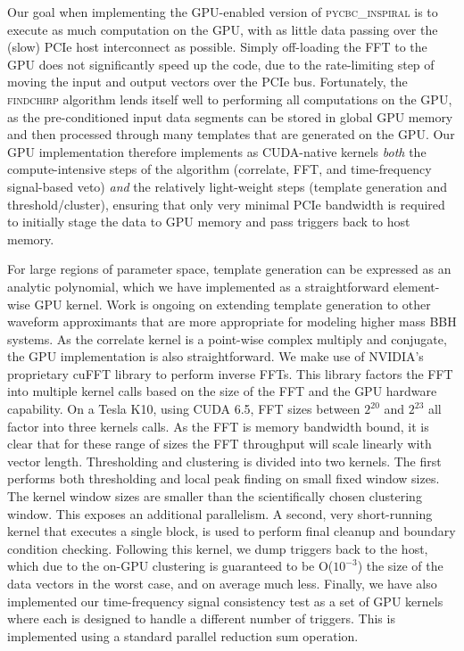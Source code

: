 Our goal when implementing the GPU-enabled version of \textsc{pycbc\_inspiral}
is to execute as much computation on the GPU, with as little data passing
over the (slow) PCIe host interconnect as possible. Simply off-loading the
FFT to the GPU does not significantly speed up the code, due to the
rate-limiting step of moving the input and output vectors over the PCIe bus.
Fortunately, the \textsc{findchirp} algorithm lends itself well to 
performing all computations on the GPU, as the pre-conditioned input data segments can be stored in global GPU
memory and then processed through many templates that are generated on
the GPU. Our GPU implementation therefore implements as CUDA-native kernels
\emph{both} the compute-intensive steps of the algorithm (correlate, FFT, and
time-frequency signal-based veto) \emph{and} the relatively light-weight steps
(template generation and threshold/cluster), ensuring that only very minimal
PCIe bandwidth is required to initially stage the data to GPU memory and pass
triggers back to host memory. 


For large regions of parameter space, template generation can be expressed as
an analytic polynomial, which we have implemented as a straightforward
element-wise GPU kernel. Work is ongoing on extending template generation to
other waveform approximants that are more appropriate for modeling higher mass
BBH systems. As the correlate kernel is a point-wise complex multiply and
conjugate, the GPU implementation is also straightforward.  We make use of
NVIDIA's proprietary cuFFT library to perform inverse FFTs.  This library
factors the FFT into multiple kernel calls based on the size of the FFT and
the GPU hardware capability. On a Tesla K10, using CUDA 6.5, FFT sizes between
$2^{20}$ and $2^{23}$ all factor into three kernels calls. As the FFT is
memory bandwidth bound, it is clear that for these range of sizes the FFT
throughput will scale linearly with vector length.  Thresholding and
clustering is divided into two kernels. The first performs both thresholding
and local peak finding on small fixed window sizes. The kernel window sizes
are smaller than the scientifically chosen clustering window. This exposes an
additional parallelism. A second, very short-running kernel that executes a
single block, is used to perform final cleanup and boundary condition
checking. Following this kernel, we dump triggers back to the host, which due
to the on-GPU clustering is guaranteed to be O($10^{-3}$) the size of the data
vectors in the worst case, and on average much less.  Finally, we have also
implemented our time-frequency signal consistency test as a set of GPU kernels
where each is designed to handle a different number of triggers. This is
implemented using a standard parallel reduction sum operation. 

